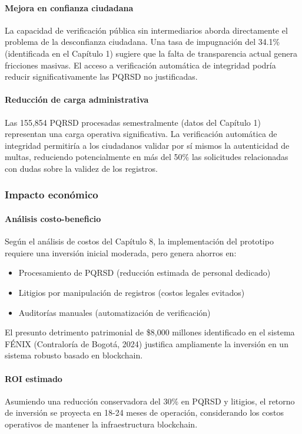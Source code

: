 \paragraph{Mejora en confianza ciudadana}
La capacidad de verificación pública sin intermediarios aborda directamente el problema de la desconfianza ciudadana. Una tasa de impugnación del 34.1\% (identificada en el Capítulo 1) sugiere que la falta de transparencia actual genera fricciones masivas. El acceso a verificación automática de integridad podría reducir significativamente las PQRSD no justificadas.

\paragraph{Reducción de carga administrativa}
Las 155,854 PQRSD procesadas semestralmente (datos del Capítulo 1) representan una carga operativa significativa. La verificación automática de integridad permitiría a los ciudadanos validar por sí mismos la autenticidad de multas, reduciendo potencialmente en más del 50\% las solicitudes relacionadas con dudas sobre la validez de los registros.

\subsubsection{Impacto económico}

\paragraph{Análisis costo-beneficio}
Según el análisis de costos del Capítulo 8, la implementación del prototipo requiere una inversión inicial moderada, pero genera ahorros en:
\begin{itemize}
    \item Procesamiento de PQRSD (reducción estimada de personal dedicado)
    \item Litigios por manipulación de registros (costos legales evitados)
    \item Auditorías manuales (automatización de verificación)
\end{itemize}

El presunto detrimento patrimonial de \$8,000 millones identificado en el sistema FÉNIX (Contraloría de Bogotá, 2024) justifica ampliamente la inversión en un sistema robusto basado en blockchain.

\paragraph{ROI estimado}
Asumiendo una reducción conservadora del 30\% en PQRSD y litigios, el retorno de inversión se proyecta en 18-24 meses de operación, considerando los costos operativos de mantener la infraestructura blockchain.

